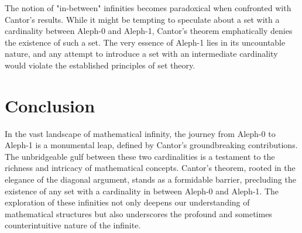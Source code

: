 \documentclass[12pt]{article}
\begin{document}
The notion of "in-between" infinities becomes paradoxical when confronted with Cantor's results. While it might be tempting to speculate about a set with a cardinality between Aleph-0 and Aleph-1, Cantor's theorem emphatically denies the existence of such a set. The very essence of Aleph-1 lies in its uncountable nature, and any attempt to introduce a set with an intermediate cardinality would violate the established principles of set theory.
\pagebreak
\section{Conclusion}

In the vast landscape of mathematical infinity, the journey from Aleph-0 to Aleph-1 is a monumental leap, defined by Cantor's groundbreaking contributions. The unbridgeable gulf between these two cardinalities is a testament to the richness and intricacy of mathematical concepts. Cantor's theorem, rooted in the elegance of the diagonal argument, stands as a formidable barrier, precluding the existence of any set with a cardinality in between Aleph-0 and Aleph-1. The exploration of these infinities not only deepens our understanding of mathematical structures but also underscores the profound and sometimes counterintuitive nature of the infinite.

 

 
\end{document}
